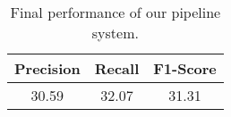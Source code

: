 \begin{table}[ht]
\centering
\begin{tabular}{|c|c|c|}
\hline

    Precision &     Recall &     F1-Score \\ \hline
    30.59     &     32.07  &     31.31    \\ \hline

\end{tabular}
\caption{\label{t:final-results} Final performance of our pipeline system. }
\end{table}
